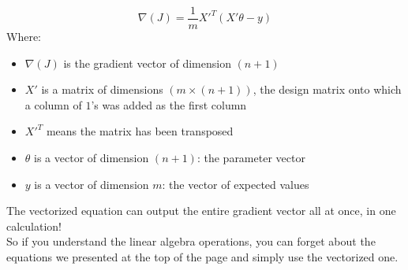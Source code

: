 $$
\nabla(J) = \frac{1}{m} {X'}^T(X'\theta - y)
$$  
Where:  
\begin{itemize}
    \item $\nabla(J)$ is the gradient vector of dimension $(n + 1)$
    \item $X'$ is a matrix of dimensions $(m \times (n + 1))$, the design matrix onto which a column of $1$'s was added as the first column
    \item ${X'}^T$ means the matrix has been transposed
    \item $\theta$ is a vector of dimension $(n + 1)$: the parameter vector 
    \item $y$ is a vector of dimension $m$: the vector of expected values
\end{itemize}
The vectorized equation can output the entire gradient vector all at once, in one calculation!\\
\newline
So if you understand the linear algebra operations, you can forget about the equations we presented at the top of the page and simply use the vectorized one.
